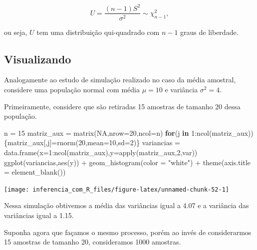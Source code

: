 \documentclass[
]{book}
\newenvironment{Shaded}{\begin{snugshade}}{\end{snugshade}}
\newcommand{\AttributeTok}[1]{\textcolor[rgb]{0.77,0.63,0.00}{#1}}
\newcommand{\ConstantTok}[1]{\textcolor[rgb]{0.00,0.00,0.00}{#1}}
\newcommand{\ControlFlowTok}[1]{\textcolor[rgb]{0.13,0.29,0.53}{\textbf{#1}}}
\newcommand{\DecValTok}[1]{\textcolor[rgb]{0.00,0.00,0.81}{#1}}
\newcommand{\FunctionTok}[1]{\textcolor[rgb]{0.00,0.00,0.00}{#1}}
\newcommand{\NormalTok}[1]{#1}
\newcommand{\OtherTok}[1]{\textcolor[rgb]{0.56,0.35,0.01}{#1}}
\newcommand{\SpecialCharTok}[1]{\textcolor[rgb]{0.00,0.00,0.00}{#1}}
\newcommand{\StringTok}[1]{\textcolor[rgb]{0.31,0.60,0.02}{#1}}
\begin{document}
\[U=\frac{(n-1)S^2}{\sigma^2}\sim \chi^2_{n-1},\]

ou seja, \(U\) tem uma distribuição qui-quadrado com \(n-1\) graus de liberdade.

\hypertarget{visualizando-2}{%
\subsection{Visualizando}\label{visualizando-2}}

Analogamente ao estudo de simulação realizado no caso da média amostral, considere uma população normal com média \(\mu=10\) e variância \(\sigma^2=4\).

Primeiramente, considere que são retiradas 15 amostras de tamanho 20 dessa população.

\begin{Shaded}
\begin{Highlighting}[]
\NormalTok{n }\OtherTok{=} \DecValTok{15}
\NormalTok{matriz\_aux }\OtherTok{=} \FunctionTok{matrix}\NormalTok{(}\ConstantTok{NA}\NormalTok{,}\AttributeTok{nrow=}\DecValTok{20}\NormalTok{,}\AttributeTok{ncol=}\NormalTok{n)}
\ControlFlowTok{for}\NormalTok{(j }\ControlFlowTok{in} \DecValTok{1}\SpecialCharTok{:}\FunctionTok{ncol}\NormalTok{(matriz\_aux))\{matriz\_aux[,j]}\OtherTok{=}\FunctionTok{rnorm}\NormalTok{(}\DecValTok{20}\NormalTok{,}\AttributeTok{mean=}\DecValTok{10}\NormalTok{,}\AttributeTok{sd=}\DecValTok{2}\NormalTok{)\}}
\NormalTok{variancias }\OtherTok{=} \FunctionTok{data.frame}\NormalTok{(}\AttributeTok{x=}\DecValTok{1}\SpecialCharTok{:}\FunctionTok{ncol}\NormalTok{(matriz\_aux),}\AttributeTok{y=}\FunctionTok{apply}\NormalTok{(matriz\_aux,}\DecValTok{2}\NormalTok{,var))}
\FunctionTok{ggplot}\NormalTok{(variancias,}\FunctionTok{aes}\NormalTok{(y)) }\SpecialCharTok{+}
  \FunctionTok{geom\_histogram}\NormalTok{(}\AttributeTok{color =} \StringTok{"white"}\NormalTok{) }\SpecialCharTok{+}
  \FunctionTok{theme}\NormalTok{(}\AttributeTok{axis.title =} \FunctionTok{element\_blank}\NormalTok{())}
\end{Highlighting}
\end{Shaded}

\begin{center}\texttt{[image: inferencia\_com\_R\_files/figure-latex/unnamed-chunk-52-1]} \end{center}

Nessa simulação obtivemos a média das variâncias igual a 4.07 e a variância das variâncias igual a 1.15.

Suponha agora que façamos o mesmo processo, porém ao invés de considerarmos 15 amostras de tamanho 20, consideramos 1000 amostras.
\end{document}
